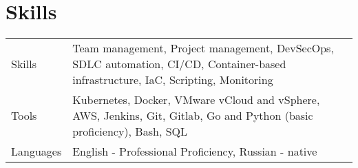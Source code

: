 \documentclass[a4paper,12pt]{article}
\begin{document}

\section{Skills}
\begin{tabularx}{\linewidth}{@{}l X@{}}
Skills &  \normalsize{Team management, Project management, DevSecOps, SDLC automation, CI/CD, Container-based infrastructure, IaC, Scripting, Monitoring}\\
Tools  &  \normalsize{Kubernetes, Docker, VMware vCloud and vSphere, AWS, Jenkins, Git, Gitlab, Go and Python (basic proficiency), Bash, SQL}\\
Languages  &  \normalsize{English - Professional Proficiency, Russian - native}\\
\end{tabularx}


\vfill
\end{document}
